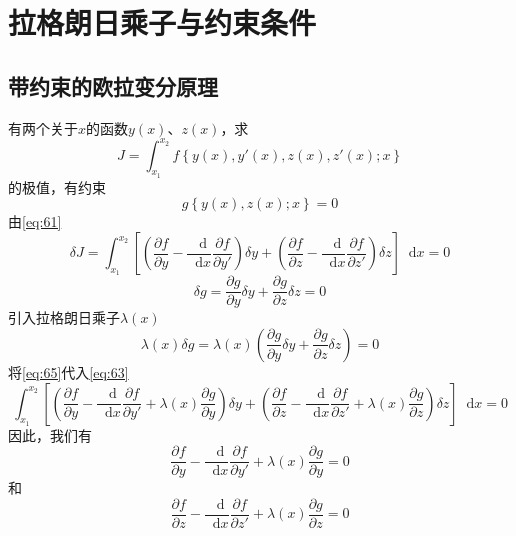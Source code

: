 \documentclass{article}
\newcommand*{\dif}{\mathop{}\!\mathrm{d}}
\begin{document}
\section{拉格朗日乘子与约束条件}

\subsection{带约束的欧拉变分原理}

有两个关于$x$的函数$y(x)$、$z(x)$，求
\begin{equation}
  \label{eq:61}
  J = \int_{x_{1}}^{x_{2}} f \left\{ y(x),y'(x),z(x),z'(x);x \right\}
\end{equation}
的极值，有约束
\begin{equation}
  \label{eq:62}
  g \left\{ y(x),z(x);x \right\} = 0
\end{equation}
由\ref{eq:61}
\begin{equation}
  \label{eq:63}
  \delta J = \int_{x_{1}}^{x_{2}} \left[ \left( \dfrac{\partial f}{\partial y} - \dfrac{\dif}{\dif x} \dfrac{\partial f}{\partial y'} \right) \delta y  + \left( \dfrac{\partial f}{\partial z} - \dfrac{\dif}{\dif x} \dfrac{\partial f}{\partial z'} \right) \delta z \right] \dif x = 0
\end{equation}
\begin{equation}
  \label{eq:64}
  \delta g = \dfrac{\partial g}{\partial y} \delta y + \dfrac{\partial g}{\partial z} \delta z = 0
\end{equation}
引入拉格朗日乘子$\lambda (x)$
\begin{equation}
  \label{eq:65}
  \lambda (x) \delta g = \lambda (x) \left( \dfrac{\partial g}{\partial y} \delta y + \dfrac{\partial g}{\partial z} \delta z \right) = 0
\end{equation}
将\ref{eq:65}代入\ref{eq:63}
\begin{equation}
  \label{eq:66}
  \int_{x_{1}}^{x_{2}} \left[ \left( \dfrac{\partial f}{\partial y} - \dfrac{\dif}{\dif x} \dfrac{\partial f}{\partial y'} + \lambda (x) \dfrac{\partial g}{\partial y} \right) \delta y  + \left( \dfrac{\partial f}{\partial z} - \dfrac{\dif}{\dif x} \dfrac{\partial f}{\partial z'}  + \lambda (x) \dfrac{\partial g}{\partial z} \right) \delta z \right] \dif x = 0
\end{equation}
因此，我们有
\begin{equation}
  \label{eq:67}
  \dfrac{\partial f}{\partial y} - \dfrac{\dif}{\dif x} \dfrac{\partial f}{\partial y'} + \lambda (x) \dfrac{\partial g}{\partial y} = 0
\end{equation}
和
\begin{equation}
  \label{eq:68}
  \dfrac{\partial f}{\partial z} - \dfrac{\dif}{\dif x} \dfrac{\partial f}{\partial z'}  + \lambda (x) \dfrac{\partial g}{\partial z} = 0
\end{equation}
\end{document}
